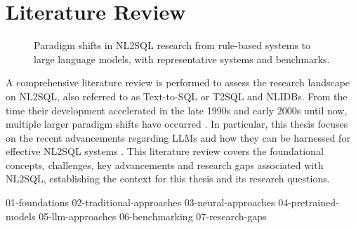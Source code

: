 \section{Literature Review}

\begin{figure}[ht]
  \centering
  \caption{Paradigm shifts in NL2SQL research from rule-based systems to large language models, with representative systems and benchmarks.}
  \label{figure:nl2sql-paradigm-shifts}
\end{figure}


A comprehensive literature review is performed to assess the research landscape
on NL2SQL, also referred to as Text-to-SQL or T2SQL and NLIDBs. From the time
their development accelerated in the late 1990s and early 2000s \citep{NLIDBs,
NLIDBTheory, ILPParsing, ILPParsing2} until now, multiple larger
paradigm shifts have occurred \citep{GRAPPA, STRUG, Seq2SQL, NALIR,
SQLizer}. In particular, this thesis focuses on the recent advancements regarding
LLMs and how they can be harnessed for effective NL2SQL systems
\citep{LLM-SQL, DAIL-SQL, T2SQL-LLM-Bench-2, T2SQL-LLM-Bench-3, Spider2, BIRD}.
This literature review covers the foundational concepts, challenges, key
advancements and research gaps associated with NL2SQL, establishing the context
for this thesis and its research questions.

{01-foundations}
{02-traditional-approaches}
{03-neural-approaches}
{04-pretrained-models}
{05-llm-approaches}
{06-benchmarking}
{07-research-gaps}
